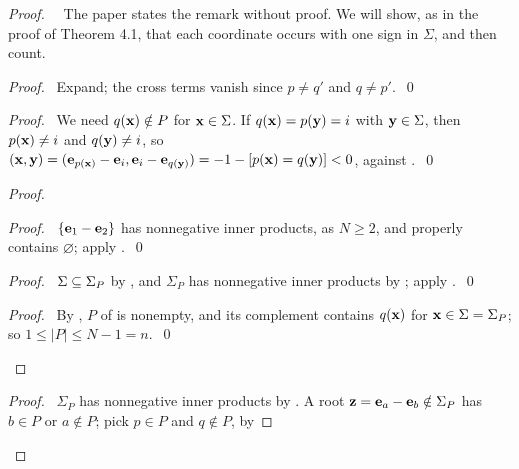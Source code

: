 \begin{proof}
 \pfsketch\ \new\ The paper states the remark without proof. We will show, as in the proof of
 Theorem 4.1, that each coordinate occurs with one sign in $\Sigma$, and then count.
 \begin{proof}\pf\ Expand; the cross terms vanish since $p\ne q'$ and $q\ne
  p'$.~\qed\end{proof}
 \begin{proof}\pf\ We need $q({\mathbf x})\notin P$ for ${\mathbf x}\in\Sigma$. If $q({\mathbf x})=p({\mathbf y})=i$ with
  ${\mathbf y}\in\Sigma$, then $p({\mathbf x})\ne i$ and $q({\mathbf y})\ne i$, so
  $({\mathbf x},{\mathbf y})=({\mathbf e}_{p({\mathbf x})}-{\mathbf e}_i,{\mathbf e}_i-{\mathbf e}_{q({\mathbf y})})=-1-[p({\mathbf x})=q({\mathbf y})]<0$, against
  .~\qed\end{proof}
 \begin{proof}
  \begin{proof}\pf\ $\{{\mathbf e}_1-{\mathbf e}_2\}$ has nonnegative inner products, as $N\ge2$, and
   properly contains $\varnothing$; apply .~\qed\end{proof}
  \begin{proof}\pf\ $\Sigma\subseteq\Sigma_P$ by , and $\Sigma_P$ has nonnegative
   inner products by ; apply .~\qed\end{proof}
  \qedstep
  \begin{proof}\pf\ By , $P$ of  is nonempty, and its
   complement contains $q({\mathbf x})$ for ${\mathbf x}\in\Sigma=\Sigma_P$; so $1\le|P|\le
   N-1=n$.~\qed\end{proof}
 \end{proof}
 \begin{proof}\pf\ $\Sigma_P$ has nonnegative inner products by . A root
  ${\mathbf z}={\mathbf e}_a-{\mathbf e}_b\notin\Sigma_P$ has $b\in P$ or $a\notin P$; pick $p\in P$ and $q\notin P$, by

\end{proof}
\end{proof}

